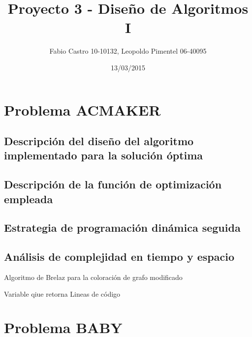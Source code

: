 \documentclass[a4paper,10pt]{article}
\title{}
\author{}
\date{}
\begin{document}
 
\title{\Huge Proyecto 3 - Diseño de Algoritmos I}
\author{Fabio Castro 10-10132, Leopoldo Pimentel 06-40095} 
\date{13/03/2015}
\maketitle


\section{Problema ACMAKER}

  \subsection{Descripción del diseño del algoritmo implementado para la solución óptima}
  \hspace{2cm}

  \subsection{Descripción de la función de optimización empleada}
  \hspace{2cm}

  \subsection{Estrategia de programación dinámica seguida}
  \hspace{2cm}

  \subsection{Análisis de complejidad en tiempo y espacio}
  \hspace{2cm}

  \begin{algorithm}                  
  \caption{Algoritmo de Brelaz para la coloración de grafo modificado}         
  \label{ACMAKER}                 
  \begin{algorithmic}[1]                 
      \ENSURE Variable qiue retorna
      \STATE Lineas de código
  \end{algorithmic}
  \end{algorithm}


\section{Problema BABY}
\end{document}
